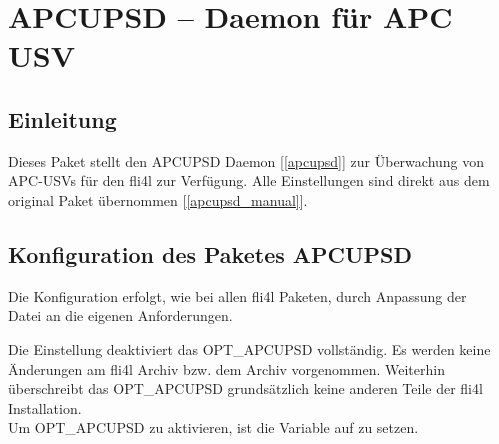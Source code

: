 \section {APCUPSD -- Daemon für APC USV}

\subsection{Einleitung}

  Dieses Paket stellt den APCUPSD  Daemon {[\ref{apcupsd}]} zur Überwachung von
  APC-USVs für den fli4l zur Verfügung.
  Alle Einstellungen sind direkt aus dem original Paket übernommen
  {[\ref{apcupsd_manual}]}.
 
\subsection {Konfiguration des Paketes APCUPSD}
     
  Die Konfiguration erfolgt, wie bei allen fli4l Paketen, durch Anpassung der \\
  Datei  
  an die eigenen Anforderungen.

\begin{description}


  Die Einstellung  deaktiviert das OPT\_APCUPSD vollständig. Es werden
  keine Änderungen am fli4l Archiv  bzw. dem Archiv 
  vorgenommen. Weiterhin überschreibt das OPT\_APCUPSD grundsätzlich keine anderen
  Teile der fli4l Installation.\\
  Um OPT\_APCUPSD zu aktivieren, ist die Variable  auf 
   zu setzen.

\end{description}

